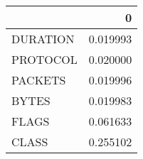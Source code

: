 \begin{tabular}{lr}
\toprule
{} &         0 \\
\midrule
DURATION &  0.019993 \\
PROTOCOL &  0.020000 \\
PACKETS  &  0.019996 \\
BYTES    &  0.019983 \\
FLAGS    &  0.061633 \\
CLASS    &  0.255102 \\
\bottomrule
\end{tabular}

